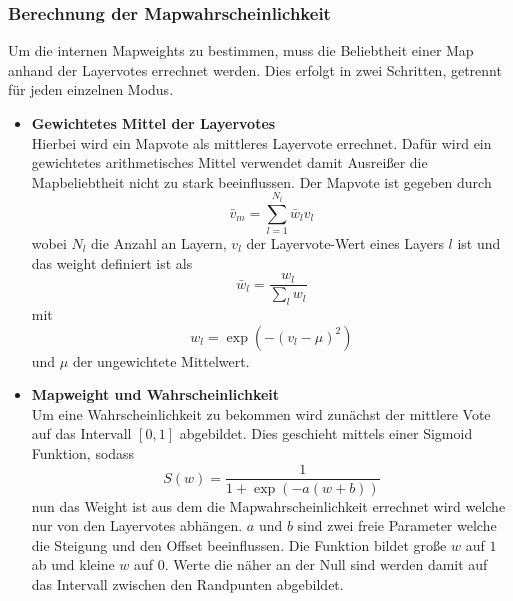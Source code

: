         \subsubsection{Berechnung der Mapwahrscheinlichkeit}
            Um die internen Mapweights zu bestimmen, muss die Beliebtheit einer Map anhand der Layervotes errechnet werden. 
            Dies erfolgt in zwei Schritten, getrennt für jeden einzelnen Modus. 
            \begin{itemize}
                \item \textbf{Gewichtetes Mittel der Layervotes}\\
                Hierbei wird ein Mapvote als mittleres Layervote errechnet. 
                Dafür wird ein gewichtetes arithmetisches Mittel verwendet damit \glqq{}Ausreißer\grqq{} die Mapbeliebtheit nicht zu stark beeinflussen. 
                Der Mapvote ist gegeben durch 
                \begin{equation}
                    \bar{v}_m = \sum_{l=1}^{N_l} \bar{w}_l v_l
                \end{equation}
                wobei $N_l$ die Anzahl an Layern, $v_l$ der Layervote-Wert eines Layers $l$ ist und das weight definiert ist als 
                \begin{equation}
                    \bar{w}_l = \frac{w_l}{\sum_l w_l}
                \end{equation}
                mit 
                \begin{equation}
                    w_l = \exp\left(-\left(v_l-\mu\right)^2\right)
                \end{equation}
                und $\mu$ der ungewichtete Mittelwert. 
                \item \textbf{Mapweight und Wahrscheinlichkeit}\\
                Um eine Wahrscheinlichkeit zu bekommen wird zunächst der mittlere Vote auf das Intervall $[0,1]$ abgebildet.
                Dies geschieht mittels einer Sigmoid Funktion, sodass 
                \begin{equation}
                    S(w) = \frac{1}{1+\exp\left(-a(w+b)\right)}
                \end{equation}
                nun das Weight ist aus dem die Mapwahrscheinlichkeit errechnet wird welche nur von den Layervotes abhängen. $a$ und $b$ sind zwei freie Parameter welche die Steigung und den Offset beeinflussen. 
                Die Funktion bildet große $w$ auf $1$ ab und kleine $w$ auf $0$. 
                Werte die näher an der Null sind werden damit auf das Intervall zwischen den Randpunten abgebildet.

\end{itemize}
